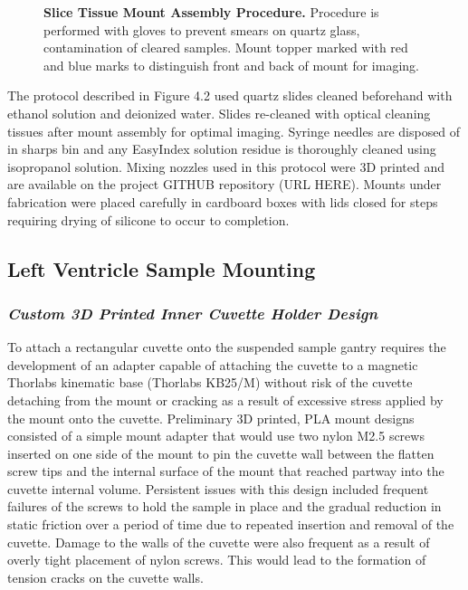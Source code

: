 \begin{figure}[H]
 \caption{\textbf{Slice Tissue Mount Assembly Procedure.} Procedure is performed with gloves to prevent smears on quartz glass, contamination of cleared samples. Mount topper marked with red and blue marks to distinguish front and back of mount for imaging.}
    \label{fig:enter-label}
\end{figure}

The protocol described in Figure 4.2 used quartz slides cleaned beforehand with ethanol solution and deionized water. Slides re-cleaned with optical cleaning tissues after mount assembly for optimal imaging. Syringe needles are disposed of in sharps bin and any EasyIndex solution residue is thoroughly cleaned using isopropanol solution. Mixing nozzles used in this protocol were 3D printed and are available on the project GITHUB repository (URL HERE). Mounts under fabrication were placed carefully in cardboard boxes with lids closed for steps requiring drying of silicone to occur to completion.



\subsection{Left Ventricle Sample Mounting}
\subsubsection{\textit{Custom 3D Printed Inner Cuvette Holder Design}}

To attach a rectangular cuvette onto the suspended sample gantry requires the development of an adapter capable of attaching the cuvette to a magnetic Thorlabs kinematic base (Thorlabs KB25/M) without risk of the cuvette detaching from the mount or cracking as a result of excessive stress applied by the mount onto the cuvette. Preliminary 3D printed, PLA mount designs consisted of a simple mount adapter that would use two nylon M2.5 screws inserted on one side of the mount to pin the cuvette wall between the flatten screw tips and the internal surface of the mount that reached partway into the cuvette internal volume. Persistent issues with this design included frequent failures of the screws to hold the sample in place and the gradual reduction in static friction over a period of time due to repeated insertion and removal of the cuvette. Damage to the walls of the cuvette were also frequent as a result of overly tight placement of nylon screws. This would lead to the formation of tension cracks on the cuvette walls.

